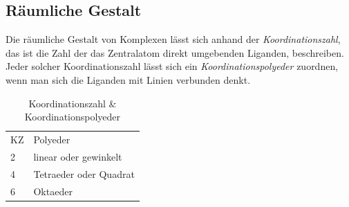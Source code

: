 \documentclass{scrartcl}
\begin{document}
\subsection{Räumliche Gestalt}
Die räumliche Gestalt von Komplexen lässt sich anhand der \emph{Koordinationszahl}, das ist die Zahl der das Zentralatom direkt umgebenden Liganden, beschreiben. Jeder solcher Koordinationszahl lässt sich ein \emph{Koordinationspolyeder} zuordnen, wenn man sich die Liganden mit Linien verbunden denkt. 
\begin{table}[h]
	\caption{Koordinationszahl \& Koordinationspolyeder}
	\begin{tabular}{l l}
		KZ & Polyeder \\
		2 & linear oder gewinkelt \\
		4 & Tetraeder oder Quadrat \\
		6 & Oktaeder 
	\end{tabular}
\end{table}
\end{document}
